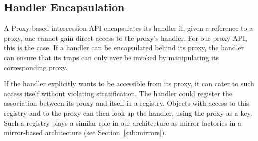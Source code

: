 \documentclass{sig-alternate}
\begin{document}

\subsection{Handler Encapsulation}
\label{sub:meta_level_encapsulation}

A Proxy-based intercession API encapsulates its handler if, given a reference to a proxy, one cannot gain direct access to the proxy's handler. For our proxy API, this is the case. If a handler can be encapsulated behind its proxy, the handler can ensure that its traps can only ever be invoked by manipulating its corresponding proxy.

If the handler explicitly wants to be accessible from its proxy, it can cater to such access itself without violating stratification. The handler could register the association between its proxy and itself in a registry. Objects with access to this registry and to the proxy can then look up the handler, using the proxy as a key. Such a registry plays a similar role in our architecture as mirror factories in a mirror-based architecture (see Section~\ref{sub:mirrors}).




\end{document}
